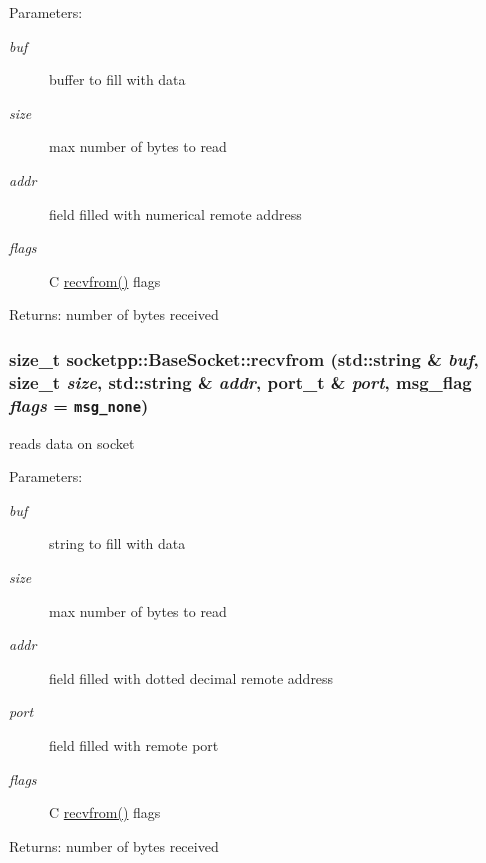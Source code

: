 \begin{CompactItemize}
\begin{Desc}
\item[Parameters:]
\begin{description}
\item[{\em buf}]buffer to fill with data \item[{\em size}]max number of bytes to read \item[{\em addr}]field filled with numerical remote address \item[{\em flags}]C \hyperlink{classsocketpp_1_1BaseSocket_6a207860c0a1328dc05bea32bb62e81f}{recvfrom()} flags \end{description}
\end{Desc}
\begin{Desc}
\item[Returns:]number of bytes received \end{Desc}
\hypertarget{classsocketpp_1_1BaseSocket_b6059e85a3c981f39ec3b464d717d633}{
\subsubsection[{recvfrom}]{\setlength{\rightskip}{0pt plus 5cm}size\_\-t socketpp::BaseSocket::recvfrom (std::string \& {\em buf}, \/  size\_\-t {\em size}, \/  std::string \& {\em addr}, \/  port\_\-t \& {\em port}, \/  msg\_\-flag {\em flags} = {\tt msg\_\-none})}}
\label{classsocketpp_1_1BaseSocket_b6059e85a3c981f39ec3b464d717d633}


reads data on socket 

\begin{Desc}
\item[Parameters:]
\begin{description}
\item[{\em buf}]string to fill with data \item[{\em size}]max number of bytes to read \item[{\em addr}]field filled with dotted decimal remote address \item[{\em port}]field filled with remote port \item[{\em flags}]C \hyperlink{classsocketpp_1_1BaseSocket_6a207860c0a1328dc05bea32bb62e81f}{recvfrom()} flags \end{description}
\end{Desc}
\begin{Desc}
\item[Returns:]number of bytes received \end{Desc}
\hypertarget{classsocketpp_1_1BaseSocket_9cc42afe664fc31970e166a3b2ea0591}{
}
\end{CompactItemize}
